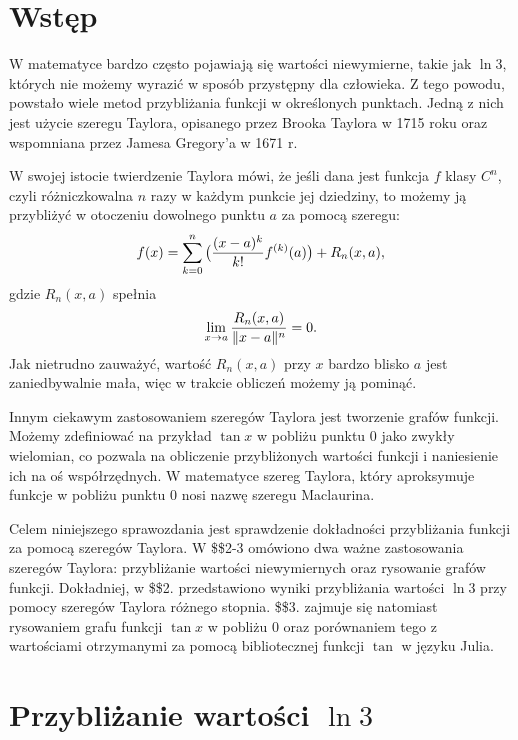 \documentclass[11pt, wide]{mwart}
\begin{document}
\maketitle
\tableofcontents

\section{Wstęp}

W matematyce bardzo często pojawiają się wartości niewymierne, takie jak $\ln 3$, których nie możemy wyrazić w sposób przystępny dla człowieka. Z tego powodu, powstało wiele metod przybliżania funkcji w określonych punktach. Jedną z nich jest użycie szeregu Taylora, opisanego przez Brooka Taylora w 1715 roku oraz wspomniana przez Jamesa Gregory'a w 1671 r.
\medskip

W swojej istocie twierdzenie Taylora mówi, że jeśli dana jest funkcja $f$ klasy $C^n$, czyli różniczkowalna $n$ razy w każdym punkcie jej dziedziny, to możemy ją przybliżyć w otoczeniu dowolnego punktu $a$ za pomocą szeregu:
$$f(x)=\sum\limits_{k=0}^n\big({(x-a)^k\over k!} f^{(k)}(a)\big)+R_n(x, a),$$
gdzie $R_n(x, a)$ spełnia
$$\lim\limits_{x\to a}{R_n(x,a)\over\|x-a\|^n}=0.$$
Jak nietrudno zauważyć, wartość $R_n(x, a)$ przy $x$ bardzo blisko $a$ jest zaniedbywalnie mała, więc w trakcie obliczeń możemy ją pominąć.

Innym ciekawym zastosowaniem szeregów Taylora jest tworzenie grafów funkcji. Możemy zdefiniować na przykład $\tan x$ w pobliżu punktu $0$ jako zwykły wielomian, co pozwala na obliczenie przybliżonych wartości funkcji i naniesienie ich na oś współrzędnych. W matematyce szereg Taylora, który aproksymuje funkcje w pobliżu punktu $0$ nosi nazwę szeregu Maclaurina.

Celem niniejszego sprawozdania jest sprawdzenie dokładności przybliżania funkcji za pomocą szeregów Taylora. W \$\$2-3 omówiono dwa ważne zastosowania szeregów Taylora: przybliżanie wartości niewymiernych oraz rysowanie grafów funkcji. Dokładniej, w \$\$2. przedstawiono wyniki przybliżania wartości $\ln 3$ przy pomocy szeregów Taylora różnego stopnia. \$\$3. zajmuje się natomiast rysowaniem grafu funkcji $\tan x$ w pobliżu $0$ oraz porównaniem tego z wartościami otrzymanymi za pomocą bibliotecznej funkcji $\tan$ w języku Julia.

\section{Przybliżanie wartości $\ln3$}
\end{document}
